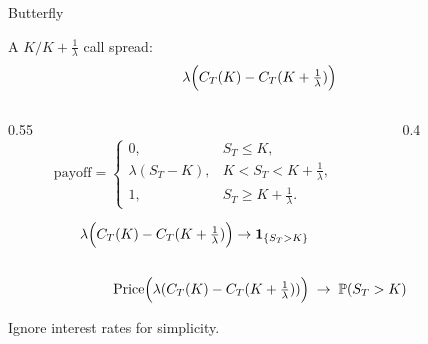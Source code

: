 \begin{frame}{Butterfly}
  \begin{sqt:definition}
    A $K/K+\tfrac1\lambda$ call spread:
    \[
      \lambda\Bigl(C_T(K)-C_T(K+\tfrac1\lambda)\Bigr)
    \]
  \end{sqt:definition}

  \begin{columns}[T]
    \begin{column}{0.55\textwidth}
      \[
        \text{payoff}=
        \begin{cases}
          0, & S_T\le K,\\
          \lambda(S_T-K), & K<S_T<K+\tfrac1\lambda,\\
          1, & S_T\ge K+\tfrac1\lambda.
        \end{cases}
      \]

      \[
        \lambda\Bigl(C_T(K)-C_T(K+\tfrac1\lambda)\Bigr)
        \to \mathbf{1}_{\{S_T>K\}}
      \]
    \end{column}
    \begin{column}{0.4\textwidth}
      \centering
    \end{column}
  \end{columns}

  \[
    \text{Price}
    \Bigl(\lambda(C_T(K)-C_T(K+\tfrac1\lambda))\Bigr)
    \;\to\;
    \mathbb P(S_T>K)
  \]

  {\footnotesize Ignore interest rates for simplicity.}
\end{frame}

